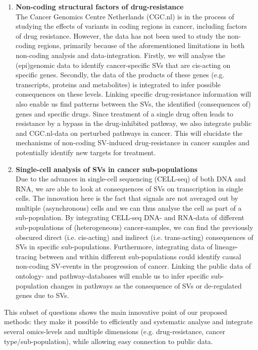 \documentclass[twoside,fontsize=12pt]{article}
\begin{document}
\begin{enumerate}
\item \textbf{Non-coding structural factors of drug-resistance} \\
The Cancer Genomics Centre Netherlands (CGC.nl) is in the process of studying the effects of variants in coding regions in cancer, including factors of drug resistance. However, the data has not been used to study the non-coding regions, primarily because of the aforementioned limitations in both non-coding analysis and data-integration. Firstly, we will analyse the (epi)genomic data to identify cancer-specific SVs that are cis-acting on specific genes. Secondly, the data of the products of these genes (e.g. transcripts, proteins and metabolites) is integrated to infer possible consequences on these levels. Linking specific drug-resistance information will also enable us find patterns between the SVs, the identified (consequences of) genes and specific drugs. Since treatment of a single drug often leads to resistance by a bypass in the drug-inhibited pathway\cite{Prahallad2012}, we also integrate public and CGC.nl-data on perturbed pathways in cancer. This will elucidate the mechanisms of non-coding SV-induced drug-resistance in cancer samples and potentially identify new targets for treatment.
\item \textbf{Single-cell analysis of SVs in cancer sub-populations} \\
Due to the advances in single-cell sequencing (CELL-seq) of both DNA and RNA, we are able to look at consequences of SVs on transcription in single cells. The innovation here is the fact that signals are not averaged out by multiple (asynchronous) cells and we can thus analyse the cell as part of a sub-population. By integrating CELL-seq DNA- and RNA-data of different sub-populations of (heterogeneous) cancer-samples, we can find the previously obscured direct (i.e. cis-acting) and indirect (i.e. trans-acting) consequences of SVs in specific sub-populations. Furthermore, integrating data of lineage-tracing between and within different sub-populations could identify causal non-coding SV-events in the progression of cancer. Linking the public data of ontology- and pathway-databases will enable us to infer specific sub-population changes in pathways as the consequence of SVs or de-regulated genes due to SVs.
\end{enumerate}
This subset of questions shows the main innovative point of our proposed methods: they make it possible to efficiently and systematic analyse and integrate several omics-levels and multiple dimensions (e.g. drug-resistance, cancer type/sub-population), while allowing easy connection to public data.
\end{document}
